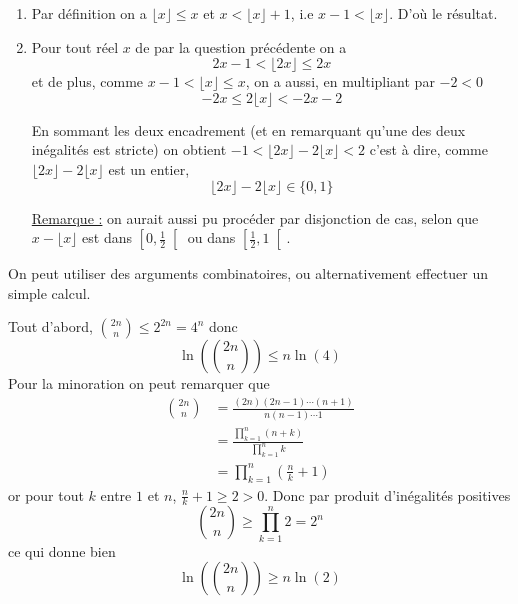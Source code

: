 \begin{sol}
\begin{enumerate}
\item Par définition on a $\lfloor x \rfloor \le x$ et $x <\lfloor x \rfloor +1$, i.e $x -1 <\lfloor x \rfloor $. D'où le résultat.
\item Pour tout réel $x$ de par la question précédente on a
$$2x-1 < \lfloor 2x  \rfloor \le 2x$$
et de plus, comme $x-1 < \lfloor x  \rfloor \le x$,
on a aussi, en multipliant par $-2 < 0$
$$-2x \le 2 \lfloor x  \rfloor < -2x-2$$

En sommant les deux encadrement (et en remarquant qu'une des deux inégalités est stricte) on obtient
$-1 <\lfloor 2x  \rfloor - 2 \lfloor x  \rfloor< 2$
c'est à dire, comme $\lfloor 2x  \rfloor - 2 \lfloor x  \rfloor$ est un entier,
$$\boxed{\lfloor 2 x \rfloor  - 2 \lfloor x \rfloor \in \{0,1\}}$$

\underline{Remarque :} on aurait aussi pu procéder par disjonction de cas, selon que $x - \lfloor x \rfloor$ est dans $\left[0,\frac{1}{2}\right[$ ou dans $\left[\frac{1}{2},1\right[$.
\end{enumerate}
\end{sol}

\begin{sol}
On peut utiliser des arguments combinatoires, ou alternativement effectuer un simple calcul.

Tout d'abord, $\binom{2n} n \le 2^{2n} = 4^n$ donc 
$$\boxed{\ln \left(\binom{2n} n \right) \le n \ln(4)}$$
Pour la minoration on peut remarquer que
$$\begin{aligned}\binom{2n} n &= \frac{(2n) (2n-1) \cdots (n+1) }{n (n-1) \cdots 1}\\
&= \frac{\prod_{k=1}^ n (n+k)}{\prod_{k=1}^n k} \\
&= \prod_{k=1}^n \left(\frac n{k}+1 \right) \end{aligned}$$
or pour tout $k$ entre $1$ et $n$, $\frac n{k}+1 \ge 2 >0$. Donc par produit d'inégalités positives
$$\binom{2n} n \ge \prod_{k=1}^n 2 = 2^n$$
ce qui donne bien 
$$\boxed{\ln \left(\binom{2n} n \right) \ge n \ln(2)}$$
\end{sol}

